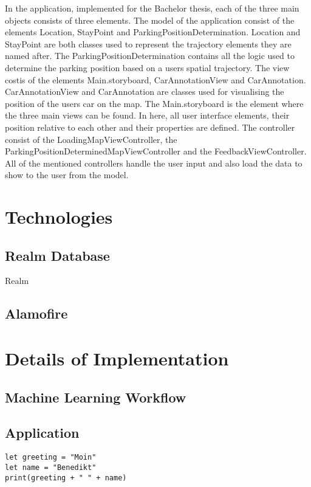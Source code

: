In the application, implemented for the Bachelor thesis, each of the three main objects consists of three elements. 
The model of the application consist of the elements Location, StayPoint and ParkingPositionDetermination. Location and StayPoint are both classes used to represent the trajectory elements they are named after. The ParkingPositionDetermination contains all the logic used to determine the parking position based on a users spatial trajectory. 
The view costis of the elements Main.storyboard, CarAnnotationView and CarAnnotation. CarAnnotationView and CarAnnotation are classes used for visualising the position of the users car on the map. The Main.storyboard is the element where the three main views can be found. In here, all user interface elements, their position relative to each other and their properties are defined.
The controller consist of the LoadingMapViewController, the ParkingPositionDeterminedMapViewController and the FeedbackViewController. All of the mentioned controllers handle the user input and also load the data to show to the user from the model. 

\section{Technologies}

\subsection{Realm Database}
Realm 

\subsection{Alamofire}

\section{Details of Implementation}
\subsection{Machine Learning Workflow}

\subsection{Application}




\begin{lstlisting}[style=swift, caption={Swift example}]
let greeting = "Moin"
let name = "Benedikt"
print(greeting + " " + name)
\end{lstlisting}
